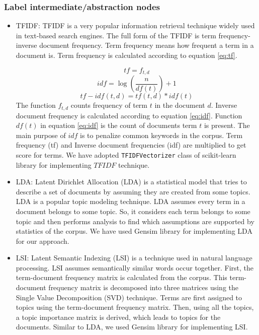 \subsubsection{Label intermediate/abstraction nodes}
\begin{itemize}
    \item TFIDF:
TFIDF \cite{ramos2003usingTfidfRelevance} is a very popular information retrieval technique widely used in text-based search engines. The full form of the TFIDF is term frequency-inverse document frequency. Term frequency means how frequent a term in a document is. Term frequency is calculated according to equation \ref{eq:tf}.

\begin{equation}
    tf = f_{t,d}
    \label{eq:tf}
\end{equation}
\begin{equation}
    idf = \log(\frac{n}{df(t)})+1
    \label{eq:idf}
\end{equation}
\begin{equation}
    tf-idf(t,d) = tf(t,d) * idf(t)
    \label{eq:TFIDF}
\end{equation}
The function $f_{t,d}$ counts frequency of term $t$ in the document $d$. Inverse document frequency is calculated according to equation \ref{eq:idf}. Function $df(t)$ in equation \ref{eq:idf} is the count of documents term $t$ is present. The main purpose of $idf$ is to penalize common keywords in the corpus. Term frequency (tf) and Inverse document frequencies (idf) are multiplied to get score for terms. We have adopted \texttt{TFIDFVectorizer} class of scikit-learn \cite{scikit-learn} library for implementing $TFIDF$ technique.
    \item LDA:
Latent Dirichlet Allocation (LDA) \cite{blei2003latentLDA} is a statistical model that tries to describe a set of documents by assuming they are created from some topics. LDA is a popular topic modeling technique. LDA assumes every term in a document belongs to some topic. So, it considers each term belongs to some topic and then performs analysis to find which assumptions are supported by statistics of the corpus. We have used Gensim \cite{gensim} library for implementing LDA for our approach.
    \item LSI:
Latent Semantic Indexing (LSI) \cite{deerwester1990indexingLSI} is a technique used in natural language processing. LSI assumes semantically similar words occur together. First, the term-document frequency matrix is calculated from the corpus. This term-document frequency matrix is decomposed into three matrices using the Single Value Decomposition (SVD) technique. Terms are first assigned to topics using the term-document frequency matrix. Then, using all the topics, a topic importance matrix is derived, which leads to topics for the documents. Similar to LDA, we used Gensim \cite{gensim} library for implementing LSI. 
\end{itemize}

